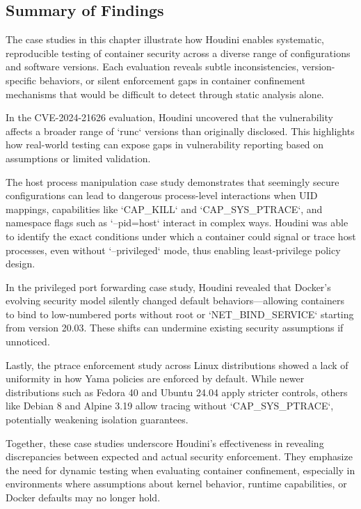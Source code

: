 \documentclass[12pt]{report}
\begin{document}
\begin{doublespace}
\section{Summary of Findings}

The case studies in this chapter illustrate how Houdini enables systematic, reproducible testing of container security across a diverse range of configurations and software versions. Each evaluation reveals subtle inconsistencies, version-specific behaviors, or silent enforcement gaps in container confinement mechanisms that would be difficult to detect through static analysis alone.

In the CVE-2024-21626 evaluation, Houdini uncovered that the vulnerability affects a broader range of `runc` versions than originally disclosed. This highlights how real-world testing can expose gaps in vulnerability reporting based on assumptions or limited validation.

The host process manipulation case study demonstrates that seemingly secure configurations can lead to dangerous process-level interactions when UID mappings, capabilities like `CAP_KILL` and `CAP_SYS_PTRACE`, and namespace flags such as `--pid=host` interact in complex ways. Houdini was able to identify the exact conditions under which a container could signal or trace host processes, even without `--privileged` mode, thus enabling least-privilege policy design.

In the privileged port forwarding case study, Houdini revealed that Docker’s evolving security model silently changed default behaviors—allowing containers to bind to low-numbered ports without root or `NET_BIND_SERVICE` starting from version 20.03. These shifts can undermine existing security assumptions if unnoticed.

Lastly, the ptrace enforcement study across Linux distributions showed a lack of uniformity in how Yama policies are enforced by default. While newer distributions such as Fedora 40 and Ubuntu 24.04 apply stricter controls, others like Debian 8 and Alpine 3.19 allow tracing without `CAP_SYS_PTRACE`, potentially weakening isolation guarantees.

Together, these case studies underscore Houdini’s effectiveness in revealing discrepancies between expected and actual security enforcement. They emphasize the need for dynamic testing when evaluating container confinement, especially in environments where assumptions about kernel behavior, runtime capabilities, or Docker defaults may no longer hold.


\end{doublespace}
\end{document}
